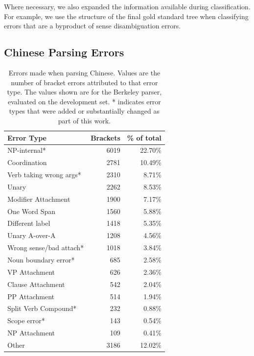 Where necessary, we also expanded the information available during
classification.  For example, we use the structure of the final gold standard
tree when classifying errors that are a byproduct of sense disambiguation
errors.

\subsection{Chinese Parsing Errors} \label{sec:chinese_parsing_errors}

\begin{table}
\centering
\begin{tabular}{lrr}
  \hline
  Error Type & Brackets & \% of total \\
  \hline
  \hline
              NP-internal* & 6019 & 22.70\% \\
              Coordination & 2781 & 10.49\% \\
   Verb taking wrong args* & 2310 &  8.71\% \\
                     Unary & 2262 &  8.53\% \\
       Modifier Attachment & 1900 &  7.17\% \\
             One Word Span & 1560 &  5.88\% \\
           Different label & 1418 &  5.35\% \\
            Unary A-over-A & 1208 &  4.56\% \\
   Wrong sense/bad attach* & 1018 &  3.84\% \\
      Noun boundary error* &  685 &  2.58\% \\
             VP Attachment &  626 &  2.36\% \\
         Clause Attachment &  542 &  2.04\% \\
             PP Attachment &  514 &  1.94\% \\
      Split Verb Compound* &  232 &  0.88\% \\
              Scope error* &  143 &  0.54\% \\
             NP Attachment &  109 &  0.41\% \\
                     Other & 3186 & 12.02\% \\
\hline
\end{tabular}
\caption{
    \label{tab:errors}
    Errors made when parsing Chinese. Values are the number of bracket errors
    attributed to that error type. The values shown are for the Berkeley parser,
		evaluated on the development set. * indicates error types that were added or
		substantially changed as part of this work.
}
\end{table}


